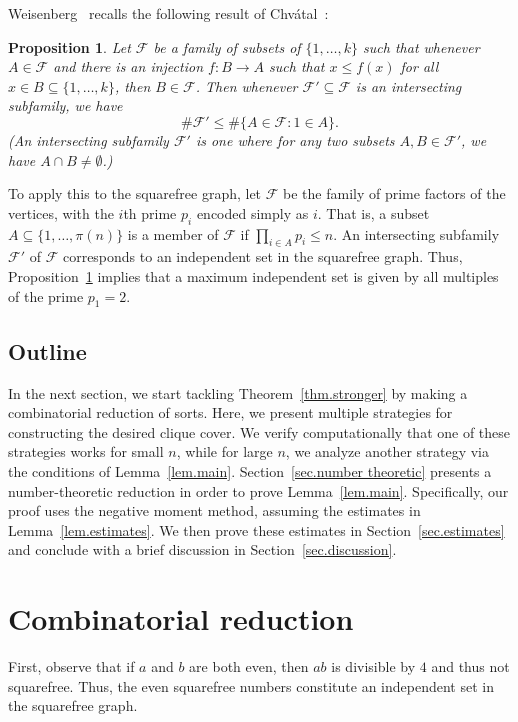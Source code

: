 \documentclass{article}
\theoremstyle{plain}
\newtheorem{proposition}[theorem]{Proposition}
\theoremstyle{definition}
\theoremstyle{remark}
\newcommand{\Chvatal}{Chv\'atal}
\begin{document}
Weisenberg~\cite{dotcom} recalls the following result of \Chvatal{}~\cite{chvatal}:

\begin{proposition}
\label{prop.chvatal}
Let $\mathcal{F}$ be a family of subsets of $\{1,\dotsc,k\}$ such that whenever $A\in\mathcal{F}$ and there is an injection $f\colon B\to A$ such that $x\le f(x)$ for all $x\in B\subseteq\{1,\dotsc,k\}$, then $B\in\mathcal{F}$.
Then whenever $\mathcal{F'}\subseteq\mathcal{F}$ is an intersecting subfamily, we have
\[
\# \mathcal{F'} \le \#\{A\in\mathcal{F}: 1\in A\}.
\]
(An intersecting subfamily $\mathcal{F'}$ is one where for any two subsets $A,B\in\mathcal{F'}$, we have $A\cap B\ne\emptyset$.)
\end{proposition}

To apply this to the squarefree graph, let $\mathcal{F}$ be the family of prime factors of the vertices, with the $i$th prime $p_i$ encoded simply as $i$.
That is, a subset $A\subseteq\{1,\dotsc,\pi(n)\}$ is a member of $\mathcal{F}$ if $\prod_{i\in A} p_i\le n$.
An intersecting subfamily $\mathcal{F'}$ of $\mathcal{F}$ corresponds to an independent set in the squarefree graph.
Thus, Proposition~\ref{prop.chvatal} implies that a maximum independent set is given by all multiples of the prime $p_1=2$.

\subsection{Outline}

In the next section, we start tackling Theorem~\ref{thm.stronger} by making a combinatorial reduction of sorts.
Here, we present multiple strategies for constructing the desired clique cover.
We verify computationally that one of these strategies works for small $n$, while for large $n$, we analyze another strategy via the conditions of Lemma~\ref{lem.main}.
Section~\ref{sec.number theoretic} presents a number-theoretic reduction in order to prove Lemma~\ref{lem.main}.
Specifically, our proof uses the negative moment method, assuming the estimates in Lemma~\ref{lem.estimates}.
We then prove these estimates in Section~\ref{sec.estimates} and conclude with a brief discussion in Section~\ref{sec.discussion}.

\section{Combinatorial reduction}
\label{sec.combinatorial}

First, observe that if $a$ and $b$ are both even, then $ab$ is divisible by $4$ and thus not squarefree.
Thus, the even squarefree numbers constitute an independent set in the squarefree graph.
\end{document}
